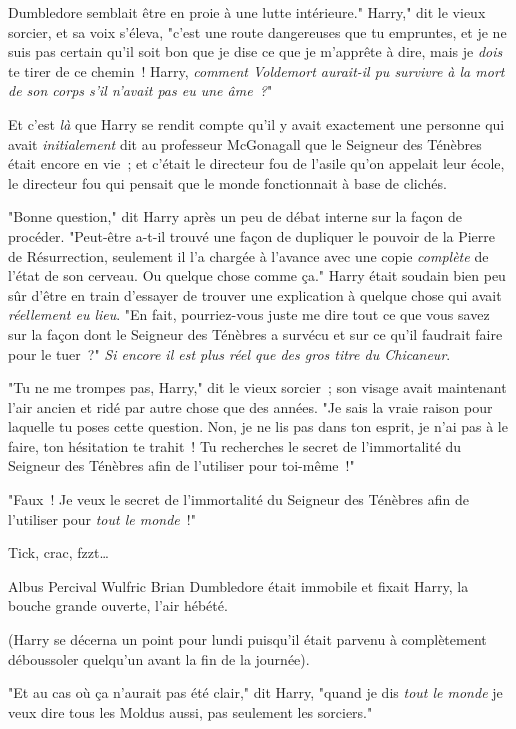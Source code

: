 Dumbledore semblait être en proie à une lutte intérieure." Harry," dit le vieux sorcier, et sa voix s'éleva, "c'est une route dangereuses que tu empruntes, et je ne suis pas certain qu'il soit bon que je dise ce que je m'apprête à dire, mais je \emph{dois} te tirer de ce chemin~! Harry, \emph{comment Voldemort aurait-il pu survivre à la mort de son corps s'il n'avait pas eu une âme~?}"

Et c'est \emph{là} que Harry se rendit compte qu'il y avait exactement une personne qui avait \emph{initialement} dit au professeur McGonagall que le Seigneur des Ténèbres était encore en vie~; et c'était le directeur fou de l'asile qu'on appelait leur école, le directeur fou qui pensait que le monde fonctionnait à base de clichés.

"Bonne question," dit Harry après un peu de débat interne sur la façon de procéder. "Peut-être a-t-il trouvé une façon de dupliquer le pouvoir de la Pierre de Résurrection, seulement il l'a chargée à l'avance avec une copie \emph{complète} de l'état de son cerveau. Ou quelque chose comme ça." Harry était soudain bien peu sûr d'être en train d'essayer de trouver une explication à quelque chose qui avait \emph{réellement eu lieu}. "En fait, pourriez-vous juste me dire tout ce que vous savez sur la façon dont le Seigneur des Ténèbres a survécu et sur ce qu'il faudrait faire pour le tuer~?" \emph{Si encore il est plus réel que des gros titre du Chicaneur}.

"Tu ne me trompes pas, Harry," dit le vieux sorcier~; son visage avait maintenant l'air ancien et ridé par autre chose que des années. "Je sais la vraie raison pour laquelle tu poses cette question. Non, je ne lis pas dans ton esprit, je n'ai pas à le faire, ton hésitation te trahit~! Tu recherches le secret de l'immortalité du Seigneur des Ténèbres afin de l'utiliser pour toi-même~!"

"Faux~! Je veux le secret de l'immortalité du Seigneur des Ténèbres afin de l'utiliser pour \emph{tout le monde}~!"

\later

Tick, crac, fzzt…

Albus Percival Wulfric Brian Dumbledore était immobile et fixait Harry, la bouche grande ouverte, l'air hébété.

(Harry se décerna un point pour lundi puisqu'il était parvenu à complètement déboussoler quelqu'un avant la fin de la journée).

"Et au cas où ça n'aurait pas été clair," dit Harry, "quand je dis \emph{tout le monde} je veux dire tous les Moldus aussi, pas seulement les sorciers."

